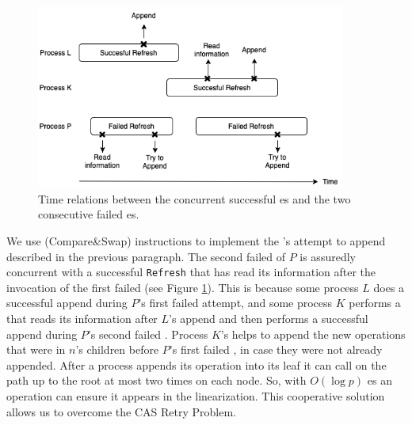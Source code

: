 \begin{figure}[hbpt]
  \center\includegraphics[width=4in]{pics/doublyrefresh-drawio.png}
  \caption[Two consecutive failed es by a
    process.]{\label{fig::simpleDoubleRefresh}Time relations between
    the concurrent successful es and the two consecutive
    failed es.} 
\end{figure}

We use  (Compare\&Swap) instructions to implement the
's attempt to append  described in the previous
paragraph. 
The second failed  of $P$ is assuredly concurrent with a
successful \texttt{Refresh} that has read its information after the
invocation of the first failed  (see Figure
\ref{fig::simpleDoubleRefresh}). This is because some process $L$ does
a successful append during $P$'s first failed attempt, and some
process $K$ performs a  that reads its information after
$L$'s append and then performs a successful append during $P$'s second
failed . Process $K$'s  helps to append the
new operations that were in $n$'s children before $P$'s first failed
, in case they were not already appended. After a process
appends its operation into its leaf it can call  on the
path up to the root at most two times on each node. So, with $O(\log
p)$ es an operation can ensure it appears in the
linearization. This cooperative solution allows us to overcome the CAS
Retry Problem. 


